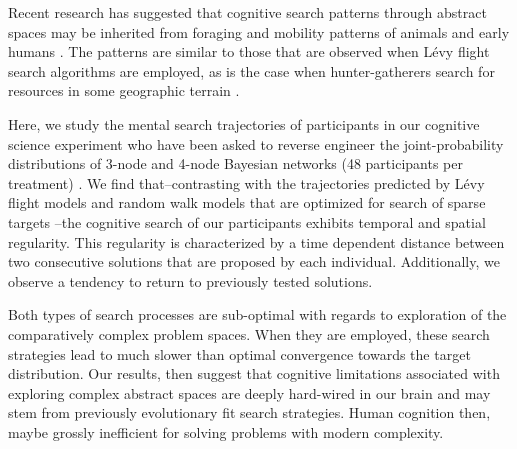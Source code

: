 Recent research \cite{baronchelli2013levy} has suggested that cognitive search patterns through abstract spaces \cite{rhodes2007human,radicchi2012rationality,radicchi2012evolution} may be inherited from foraging and mobility patterns of animals \cite{viswanathan1996levy,ramos2004levy,reynolds2007displaced} and early humans \cite{gonzalez2008understanding,song2010modelling,rhee2011levy}. The patterns are similar to those that are observed when L\'evy flight search algorithms are employed, as is the case when hunter-gatherers search for resources in some geographic terrain \cite{brown2007levy,raichlen2014evidence}. 

Here, we study the mental search trajectories of participants in our cognitive science experiment who have been asked to reverse engineer the joint-probability distributions of 3-node and 4-node Bayesian networks (48 participants per treatment) \cite{steyvers2003inferring,pearl2009causality}. We find that--contrasting with the trajectories predicted by L\'evy flight models and random walk models that are optimized for search of sparse targets \cite{viswanathan1999optimizing,edwards2007revisiting,song2010modelling,viswanathan2011physics}--the cognitive search of our participants exhibits temporal and spatial regularity. This regularity is characterized by a time dependent distance between two consecutive solutions that are proposed by each individual.  Additionally, we observe a tendency to return to previously tested solutions. 

Both types of search processes are sub-optimal with regards to exploration of the comparatively complex problem spaces. When they are employed, these search strategies lead to much slower than optimal convergence towards the target distribution. Our results, then suggest that cognitive limitations associated with exploring complex abstract spaces are deeply hard-wired in our brain and may stem from previously evolutionary fit search strategies.  Human cognition then, maybe grossly inefficient for solving problems with modern complexity.
